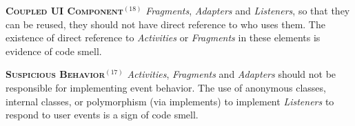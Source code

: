   \noindent
  \textbf{\textsc{{\small Coupled UI Component}}}$^{(18)}$ \textit{Fragments}, \textit{Adapters} and \textit{Listeners}, so that they can be reused, they should not have direct reference to who uses them. The existence of direct reference to \textit{Activities} or \textit{Fragments} in these elements is evidence of code smell.


  \noindent
  \textsc{\textbf{{\small Suspicious Behavior}}}$^{(17)}$ \textit{Activities}, \textit{Fragments} and \textit{Adapters} should not be responsible for implementing event behavior. The use of anonymous classes, internal classes, or polymorphism (via implements) to implement \textit{Listeners} to respond to user events is a sign of code smell.



